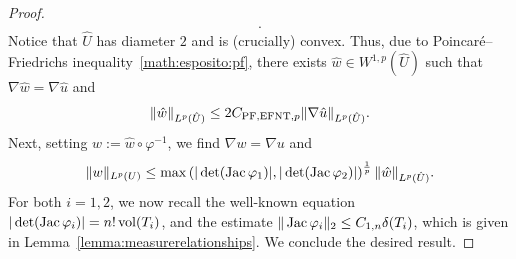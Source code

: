 \documentclass[10pt,letterpaper]{article}
\begin{document}
\begin{proof}
\begin{align*}
        .
    \end{align*}
    Notice that $\hat U$ has diameter $2$ and is (crucially) convex. 
    Thus, due to Poincar\'e--Friedrichs inequality~\eqref{math:esposito:pf}, there exists $\hat w \in W^{1,p}(\hat U)$ such that $\nabla \hat w = \nabla \hat u$ and 
    \begin{align*}
        \| \hat w \|_{L^{p}(\hat U)}
        \leq 
        2 C_{{\rm PF},{\rm EFNT},p}
        \| \nabla \hat u \|_{L^{p}(\hat U)}
        .
    \end{align*}
    Next, setting $w := \hat w \circ \varphi^{-1}$, we find $\nabla w = \nabla u$ and 
    \begin{align*}
        \| w \|_{L^{p}(U)}
        \leq 
        \max\left( 
            |\det(\operatorname{{\rm Jac}} \varphi_1)|
            ,
            |\det(\operatorname{{\rm Jac}} \varphi_2)|
        \right)^{\frac 1 p}
        \| \hat w \|_{L^{p}(\hat U)}
        .
    \end{align*}
    For both $i = 1,2$, we now recall the well-known equation $|\det(\operatorname{{\rm Jac}}\varphi_i)| = n! \operatorname{vol}(T_i)$, 
    and the estimate $\|  \operatorname{{\rm Jac}} \varphi_i  \|_{2} \leq C_{1,n} {\delta}(T_i)$, which is given in Lemma~\ref{lemma:measurerelationships}. We conclude the desired result.

\end{proof}
\end{document}
